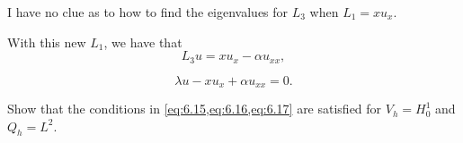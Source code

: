 \begin{solution}{5.6}
    I have no clue as to how to find the eigenvalues for $L_3$ when $L_1 = x u_x$.

    With this new $L_1$, we have that
    \begin{equation}
        L_3 u = x u_x - \alpha u_{xx},
    \end{equation}

    \begin{equation}
        \lambda u - x u_x + \alpha u_{xx} = 0.
    \end{equation}
\end{solution}

\begin{exercise}{6.1}
    Show that the conditions in \cref{eq:6.15,eq:6.16,eq:6.17} are satisfied for $V_h = H^1_0$ and $Q_h = L^2$.
\end{exercise}

